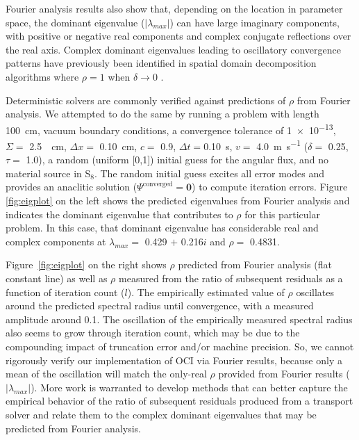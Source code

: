 Fourier analysis results also show that, depending on the location in parameter space, the dominant eigenvalue ($|\lambda_{max}|$) can have large imaginary components, with positive or negative real components and complex conjugate reflections over the real axis.
Complex dominant eigenvalues leading to oscillatory convergence patterns have previously been identified in spatial domain decomposition algorithms where $\rho=1$ when $\delta \rightarrow 0$ \cite{compeig2019ani}. 

Deterministic solvers are commonly verified against predictions of $\rho$ from Fourier analysis.
We attempted to do the same by running a problem with length \SI{100}{\centi\meter}, vacuum boundary conditions, a convergence tolerance of \num{1e-13}, $\Sigma=$ \SI{2.5}{\per\centi\meter}, $\Delta x=$ \SI{0.10}{\centi\meter}, $c=$ \num{0.9}, $\Delta t=$\SI{0.10}{\s}, $v=$ \SI{4.0}{\meter\per\s} ($\delta =$ \num{0.25}, $\tau=$ \num{1.0}), a random (uniform [0,1]) initial guess for the angular flux, and no material source in S$_8$.
The random initial guess excites all error modes and provides an anaclitic solution ($\Psi^{\text{converged}} = \bm{0}$) to compute iteration errors.
Figure \ref{fig:eigplot} on the left shows the predicted eigenvalues from Fourier analysis and indicates the dominant eigenvalue that contributes to $\rho$ for this particular problem.
In this case, that dominant eigenvalue has considerable real and complex components at $\lambda_{max} =$ \num{0.429} $+$ \num{0.216}$i$ and $\rho=$ \num{0.4831}.

Figure~\ref{fig:eigplot} on the right shows $\rho$ predicted from Fourier analysis (flat constant line) as well as $\rho$ measured from the ratio of subsequent residuals as a function of iteration count ($l$).
The empirically estimated value of $\rho$ oscillates around the predicted spectral radius until convergence, with a measured amplitude around \num{0.1}.
The oscillation of the empirically measured spectral radius also seems to grow through iteration count, which may be due to the compounding impact of truncation error and/or machine precision.
So, we cannot rigorously verify our implementation of OCI via Fourier results, because only a mean of the oscillation will match the only-real $\rho$ provided from Fourier results ($|\lambda_{max}|$).
More work is warranted to develop methods that can better capture the empirical behavior of the ratio of subsequent residuals produced from a transport solver and relate them to the complex dominant eigenvalues that may be predicted from Fourier analysis.


